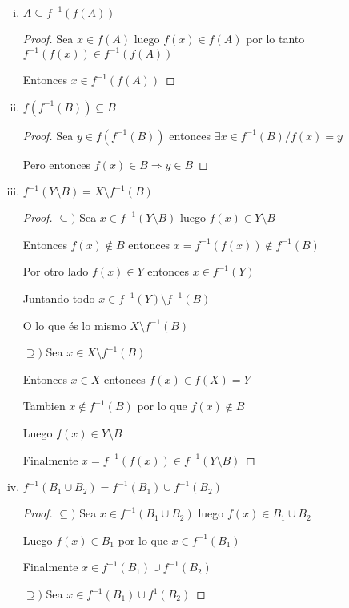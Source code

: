 \documentclass[12pt]{article}
\newcommand{\Ra}{\Rightarrow}
\theoremstyle{definition}
\begin{document}
\begin{enumerate}[i.]
  \item $A \subseteq f^{-1} (f(A))$
    \begin{proof}
      
    Sea $x \in f(A)$ luego $f(x) \in f(A)$ por lo tanto $f^{-1}(f(x)) \in f^{-1}(f(A))$  
    
    Entonces $x \in f^{-1}(f(A)) $ 
  \end{proof}
  \item $f(f^{-1}(B)) \subseteq B$
    \begin{proof}
      Sea $y \in f(f^{-1}(B))$ entonces $\exists x \in f^{-1}(B) / f(x) = y$

      Pero entonces $f(x) \in B \Ra y \in B$
    \end{proof}
     
  \item $f^{-1}(Y \setminus B) = X \setminus f^{-1}(B)$
    \begin{proof}
      $\subseteq )$ Sea $x \in f^{-1}(Y \setminus B)$ luego $f(x) \in Y \setminus B$

      Entonces $f(x) \notin B$ entonces $x = f^{-1}(f(x)) \notin f^{-1}(B) $

      Por otro lado $f(x) \in Y$ entonces $x \in f^{-1}(Y)$

      Juntando todo $x \in f^{-1}(Y) \setminus f^{-1}(B)$

      O lo que és lo mismo $X \setminus f^{-1}(B)$

      $\supseteq )$ Sea $x \in X \setminus f^{-1}(B)$ 

      Entonces $x \in X$ entonces $f(x) \in f(X)=Y $

      Tambien $x \notin f^{-1}(B)$ por lo que $f(x) \notin B$

      Luego $f(x) \in Y \setminus B$

      Finalmente $x = f^{-1}(f(x)) \in f^{-1}(Y \setminus B)$
     \end{proof}

   \item $f^{-1}(B_{1} \cup B_{2}) = f^{-1}(B_{1}) \cup f^{-1}(B_{2})$
      \begin{proof}
        $\subseteq )$ Sea $ x \in f^{-1}(B_{1} \cup B_{2})$ luego $f(x) \in B_{1} \cup B_{2}$

	Luego $f(x) \in B_{1}$ por lo que $x \in f^{-1}(B_{1})$

	Finalmente $x \in f^{-1}(B_{1}) \cup f^{-1}(B_{2})$

        $\supseteq )$ Sea $x \in f^{-1}(B_{1}) \cup f^{1}(B_{2})$


\end{proof}
\end{enumerate}
\end{document}
